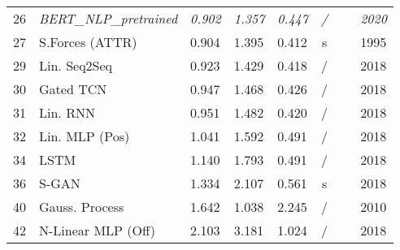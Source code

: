 \documentclass[a4paper,conference]{IEEEtran}
\newcommand{\blu}[1]{{\emph{\color{blue} {#1}}}}
\begin{document}
\begin{table}[t]
\begin{center}
{\begin{tabular}{cllllccl}
26 & \blu{BERT\_NLP\_pretrained} &	\blu{0.902} & \blu{1.357} & \blu{0.447}&\blu{/}&&  \blu{2020} \\
    27  & S.Forces (ATTR)  & 0.904  & 1.395 & 0.412& s &\cite{helbing1995social}& 1995 \\
29  & Lin. Seq2Seq & 0.923 & 1.429 & 0.418& /&\cite{becker2018evaluation}&  2018 \\
30  & Gated TCN & 0.947 & 1.468 & 0.426& /&\cite{bai2018empirical}&  2018 \\
31  & Lin. RNN & 0.951 & 1.482 & 0.420& /&\cite{becker2018evaluation}&  2018 \\
32  & Lin. MLP (Pos) & 1.041 & 1.592 & 0.491& /&\cite{becker2018evaluation}&  2018 \\
34 & LSTM &	1.140 & 1.793 & 0.491& /&\cite{LSTM_MATLAB} & 2018 \\
36  & S-GAN & 1.334  & 2.107 & 0.561& s &~\cite{gupta2018social}& 2018   \\
40  & Gauss. Process  & 1.642           & 1.038 & 2.245& /&\cite{trautman2010iros}&  2010 \\
42  & N-Linear MLP (Off) & 2.103 & 3.181 & 1.024& /&~\cite{becker2018evaluation}&  2018  \\
\bottomrule
\end{tabular}
}
\end{center}
\vspace{-0.5cm}

\end{table}

\fi
\end{document}
